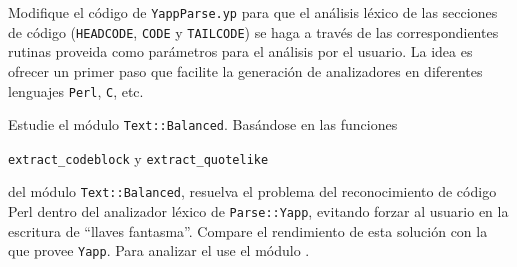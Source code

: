 %

Modifique el código de \verb|YappParse.yp| para que el análisis
léxico de las secciones de código (\verb|HEADCODE|, \verb|CODE| y \verb|TAILCODE|)
se haga a través de las correspondientes rutinas proveida como parámetros 
para el análisis por el usuario. La idea es ofrecer un primer paso
que facilite la generación de analizadores en diferentes 
lenguajes \verb|Perl|, \verb|C|, etc.

Estudie el módulo \verb|Text::Balanced|. Basándose en 
las funciones 

\verb|extract_codeblock| y \verb|extract_quotelike|

del módulo \verb|Text::Balanced|, resuelva el problema del reconocimiento
de código Perl dentro del analizador léxico de \verb|Parse::Yapp|,
evitando forzar al usuario en la escritura de ``llaves fantasma''.
Compare el rendimiento de esta solución con la que provee \verb|Yapp|.
Para analizar el  use el módulo .

